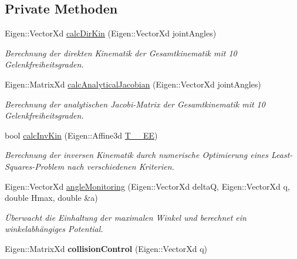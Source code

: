 \subsection*{Private Methoden}
\begin{DoxyCompactItemize}
\item 
Eigen\-::\-Vector\-Xd \hyperlink{classNumericKinematic_a48e3a4bce7cb5a0c410261cb110eb371}{calc\-Dir\-Kin} (Eigen\-::\-Vector\-Xd joint\-Angles)
\begin{DoxyCompactList}\small\item\em Berechnung der direkten Kinematik der Gesamtkinematik mit 10 Gelenkfreiheitsgraden. \end{DoxyCompactList}\item 
Eigen\-::\-Matrix\-Xd \hyperlink{classNumericKinematic_ac106c549b81876ea8310dd42e8530a56}{calc\-Analytical\-Jacobian} (Eigen\-::\-Vector\-Xd joint\-Angles)
\begin{DoxyCompactList}\small\item\em Berechnung der analytischen Jacobi-\/\-Matrix der Gesamtkinematik mit 10 Gelenkfreiheitsgraden. \end{DoxyCompactList}\item 
bool \hyperlink{classNumericKinematic_a39d3e132f2d0786815cc9b5dc94f186a}{calc\-Inv\-Kin} (Eigen\-::\-Affine3d \hyperlink{classIKinematic_a1c0a95317992b7fcaf26ab2bf9aaf3de}{T\-\_\-\_\-\-E\-E})
\begin{DoxyCompactList}\small\item\em Berechnung der inversen Kinematik durch numerische Optimierung eines Least-\/\-Squares-\/\-Problem nach verschiedenen Kriterien. \end{DoxyCompactList}\item 
Eigen\-::\-Vector\-Xd \hyperlink{classNumericKinematic_ad3306dc5d1753c1bc403e5274c725ada}{angle\-Monitoring} (Eigen\-::\-Vector\-Xd delta\-Q, Eigen\-::\-Vector\-Xd q, double Hmax, double \&a)
\begin{DoxyCompactList}\small\item\em Überwacht die Einhaltung der maximalen Winkel und berechnet ein winkelabhängiges Potential. \end{DoxyCompactList}\item 
\hypertarget{classNumericKinematic_a7173a170876e1f2500feeb82b5f91b5e}{Eigen\-::\-Matrix\-Xd {\bfseries collision\-Control} (Eigen\-::\-Vector\-Xd q)}\label{classNumericKinematic_a7173a170876e1f2500feeb82b5f91b5e}


\end{DoxyCompactItemize}
